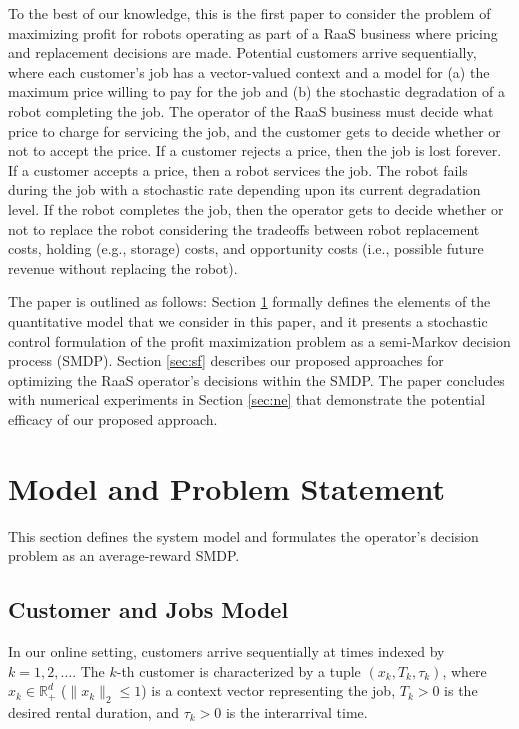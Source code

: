 \documentclass[letterpaper, 10 pt, conference]{IEEEconf}
\begin{document}
To the best of our knowledge, this is the first paper to consider the problem of maximizing profit for robots operating as part of a RaaS business where pricing and replacement decisions are made. Potential customers arrive sequentially, where each customer's job has a vector-valued context and a model for (a) the maximum price willing to pay for the job and (b) the stochastic degradation of a robot completing the job. The operator of the RaaS business must decide what price to charge for servicing the job, and the customer gets to decide whether or not to accept the price. If a customer rejects a price, then the job is lost forever. If a customer accepts a price, then a robot services the job. The robot fails during the job with a stochastic rate depending upon its current degradation level. If the robot completes the job, then the operator gets to decide whether or not to replace the robot considering the tradeoffs between robot replacement costs, holding (e.g., storage) costs, and opportunity costs (i.e., possible future revenue without replacing the robot). 

The paper is outlined as follows: Section \ref{sec:s&m} formally defines the elements of the quantitative model that we consider in this paper, and it presents a stochastic control formulation of the profit maximization problem as a semi-Markov decision process (SMDP). Section \ref{sec:sf} describes our proposed approaches for optimizing the RaaS operator's decisions within the SMDP. The paper concludes with numerical experiments in Section \ref{sec:ne} that demonstrate the potential efficacy of our proposed approach.

\section{Model and Problem Statement}
\label{sec:s&m}

This section defines the system model and formulates the operator's decision problem as an average-reward SMDP.

\subsection{Customer and Jobs Model}

In our online setting, customers arrive sequentially at times indexed by $k=1, 2, \dots$. The $k$-th customer is characterized by a tuple $(x_k, T_k, \tau_k)$, where $x_k \in \mathbb{R}_+^d$ ($\|x_k\|_2 \leq 1$) is a context vector representing the job, $T_k > 0$ is the desired rental duration, and $\tau_k > 0$ is the interarrival time.
\end{document}
